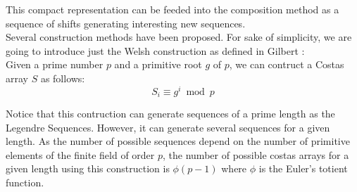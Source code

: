 This compact representation can be feeded into the composition method as
a sequence of shifts generating interesting new
sequences\cite{moreno_costas}.\\

Several construction methods have
been proposed. For sake of simplicity, we are going to introduce just the Welsh
construction as defined in Gilbert \cite{gilbert_costas}:\\

Given a prime number $p$ and a primitive root $g$ of $p$, we can contruct a
Costas array $S$ as follows:
\begin{equation}
  S_{i} \equiv g^{i} \bmod p
\end{equation}

Notice that this contruction can generate sequences of a prime length as
the Legendre Sequences. However, it can generate several sequences for a given
length. As the number of possible sequences depend on the number of primitive
elements of the finite field of order $p$, the number of possible costas arrays
for a given length using this construction is $\phi(p-1)$ where $\phi$ is the
Euler's totient function.
